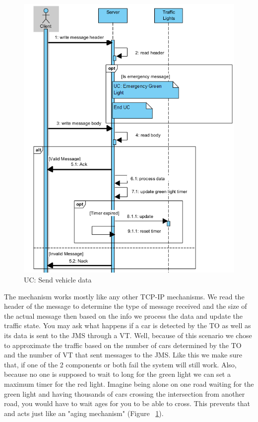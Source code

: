 \documentclass[17pt]{report}
\begin{document}
\begin{figure}[h!]
    \includegraphics[width=\textwidth]{UC/SendVehicleData.png}
    \caption{UC: Send vehicle data}
    \label{fig:UC_SendVehicleData}
\end{figure}

The mechanism works mostly like any other TCP-IP mechanisms.
We read the header of the message to determine the type of 
message received and the size of the actual message then
based on the info we process the data and update the traffic 
state. You may ask what happens if a car is detected by the 
TO as well as its data is sent to the JMS through a VT.
Well, because of this scenario we chose to approximate the 
traffic based on the number of cars determined by the TO 
and the number of VT that sent messages to the JMS. Like this
we make sure that, if one of the 2 components or both fail the system
will still work. Also, because no one is supposed to wait to long
for the green light we can set a maximum timer for the red light.
Imagine being alone on one road waiting for the green light and
having thousands of cars crossing the intersection from another road,
you would have to wait ages for you to be able to cross. This prevents that
and acts just like an "aging mechanism" (Figure ~\ref{fig:UC_SendVehicleData}).
\end{document}
